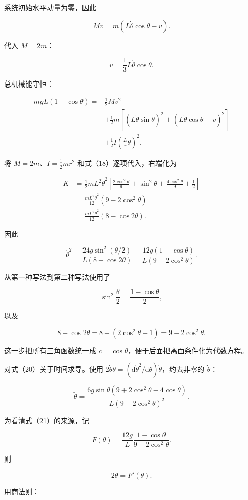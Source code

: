 \documentclass[12pt,a4paper,UTF8]{ctexart}
\begin{document}
系统初始水平动量为零，因此

\[Mv=m(L\dot\theta\cos\theta-v). \tag{17}\]

代入 \(M=2m\)：

\[\boxed{v=\frac13L\dot\theta\cos\theta}. \tag{18}\]

总机械能守恒：

\[\begin{aligned}
mgL(1-\cos\theta)
={}&\frac12Mv^2\\
&+\frac12m\left[(L\dot\theta\sin\theta)^2
+(L\dot\theta\cos\theta-v)^2\right]\\
&+\frac12I\left(\frac{L}{r}\dot\theta\right)^2.
\end{aligned} \tag{19}\]

将 \(M=2m\)、\(I=\frac12mr^2\) 和式（18）逐项代入，右端化为

\[\begin{aligned}
K
&=\frac12mL^2\dot\theta^2
\left[\frac{2\cos^2\theta}{9}
+\sin^2\theta+\frac{4\cos^2\theta}{9}+\frac12\right]\\
&=\frac{mL^2\dot\theta^2}{12}(9-2\cos^2\theta)\\
&=\frac{mL^2\dot\theta^2}{12}(8-\cos2\theta).
\end{aligned}\]

因此

\[\boxed{
\dot\theta^2
=\frac{24g\sin^2(\theta/2)}{L(8-\cos2\theta)}
=\frac{12g(1-\cos\theta)}{L(9-2\cos^2\theta)}
}. \tag{20}\]

从第一种写法到第二种写法使用了

\[\sin^2\frac\theta2=\frac{1-\cos\theta}{2},\]

以及

\[8-\cos2\theta
=8-(2\cos^2\theta-1)
=9-2\cos^2\theta.\]

这一步把所有三角函数统一成
\(c=\cos\theta\)，便于后面把离面条件化为代数方程。

对式（20）关于时间求导。使用
\(2\dot\theta\ddot\theta=(\mathrm d\dot\theta^2/\mathrm d\theta)\dot\theta\)，约去非零的
\(\dot\theta\)：

\[\boxed{
\ddot\theta
=\frac{6g\sin\theta(9+2\cos^2\theta-4\cos\theta)}
{L(9-2\cos^2\theta)^2}
}. \tag{21}\]

为看清式（21）的来源，记

\[F(\theta)=\frac{12g}{L}
\frac{1-\cos\theta}{9-2\cos^2\theta}.\]

则

\[2\ddot\theta=F'(\theta).\]

用商法则：
\end{document}
